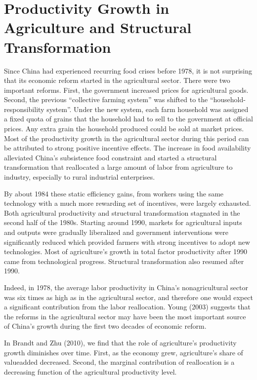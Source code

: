 \documentclass{article}
\begin{document}
    \section*{Productivity Growth in Agriculture and Structural Transformation}
    Since China had experienced recurring food crises before 1978, it is not surprising that its economic reform started in the agricultural sector. There were two important reforms. First, the government increased prices for agricultural goods. Second, the previous “collective farming system” was shifted to the “household-responsibility system”. Under the new system, each farm household was assigned a fixed quota of grains that the household had to sell to the government at official prices. Any extra grain the household produced could be sold at market prices. Most of the productivity growth in the agricultural sector during this period can be attributed to strong positive incentive effects. The increase in food availability alleviated China’s subsistence food constraint and started a structural transformation that reallocated a large amount of labor from agriculture to industry, especially to rural industrial enterprises.
    
    By about 1984 these static efficiency gains, from workers using the same technology with a much more rewarding set of incentives, were largely exhausted. Both agricultural productivity and structural transformation stagnated in the second half of the 1980s. Starting around 1990, markets for agricultural inputs and outputs were gradually liberalized and government interventions were significantly reduced which provided farmers with strong incentives to adopt new technologies. Most of agriculture’s growth in total factor productivity after 1990 came from technological progress. Structural transformation also resumed after 1990. 

    Indeed, in 1978, the average labor productivity in China’s nonagricultural sector was six times as high as in the agricultural sector, and therefore one would expect a significant contribution from the labor reallocation. Young (2003) suggests that the reforms in the agricultural sector may have been the most important source of China’s growth during the first two decades of economic reform.

    In Brandt and Zhu (2010), we find that the role of agriculture’s productivity growth diminishes over time. First, as the economy grew, agriculture’s share of valueadded decreased. Second, the marginal contribution of reallocation is a decreasing function of the agricultural productivity level.
\end{document}
